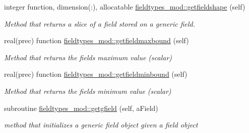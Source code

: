 \begin{DoxyCompactItemize}
integer function, dimension(\+:), allocatable \mbox{\hyperlink{namespacefieldtypes__mod_ab8a0fa52771fc81b6f8a39cbb9ad2c34}{fieldtypes\+\_\+mod\+::getfieldshape}} (self)
\begin{DoxyCompactList}\small\item\em Method that returns a slice of a field stored on a generic field. \end{DoxyCompactList}\item 
real(prec) function \mbox{\hyperlink{namespacefieldtypes__mod_a1012f73b2800753dd774d0dbff861b6f}{fieldtypes\+\_\+mod\+::getfieldmaxbound}} (self)
\begin{DoxyCompactList}\small\item\em Method that returns the field\textquotesingle{}s maximum value (scalar) \end{DoxyCompactList}\item 
real(prec) function \mbox{\hyperlink{namespacefieldtypes__mod_aec092e7c0b82a7b3a828ae18af80b810}{fieldtypes\+\_\+mod\+::getfieldminbound}} (self)
\begin{DoxyCompactList}\small\item\em Method that returns the field\textquotesingle{}s minimum value (scalar) \end{DoxyCompactList}\item 
subroutine \mbox{\hyperlink{namespacefieldtypes__mod_a214565d2002baff775a030611630fc32}{fieldtypes\+\_\+mod\+::getgfield}} (self, a\+Field)
\begin{DoxyCompactList}\small\item\em method that initializes a generic field object given a field object \end{DoxyCompactList}\end{DoxyCompactItemize}
